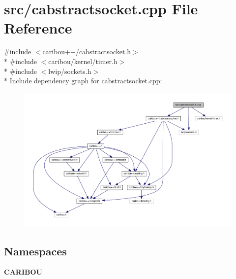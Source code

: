 \section{src/cabstractsocket.cpp File Reference}
\label{cabstractsocket_8cpp}
{\ttfamily \#include $<$caribou++/cabstractsocket.\+h$>$}\\*
{\ttfamily \#include $<$caribou/kernel/timer.\+h$>$}\\*
{\ttfamily \#include $<$lwip/sockets.\+h$>$}\\*
Include dependency graph for cabstractsocket.\+cpp\+:
\nopagebreak
\begin{figure}[H]
\begin{center}
\leavevmode
\includegraphics[width=350pt]{cabstractsocket_8cpp__incl}
\end{center}
\end{figure}
\subsection*{Namespaces}
\begin{DoxyCompactItemize}
\item 
 {\bf C\+A\+R\+I\+B\+OU}
\end{DoxyCompactItemize}
